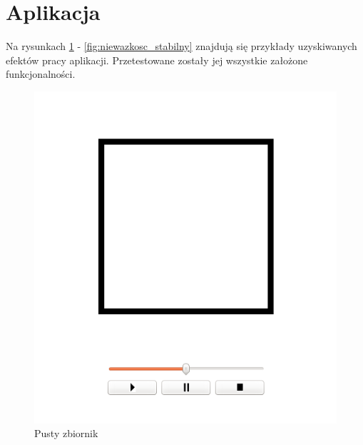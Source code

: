 
\section{Aplikacja}
Na rysunkach \ref{fig:pusty} - \ref{fig:niewazkosc_stabilny} znajdują się przykłady uzyskiwanych efektów pracy aplikacji. Przetestowane zostały jej wszystkie założone funkcjonalności.

\begin{minipage}{0.5\textwidth}
\begin{figure}[H]
 \begin{center} 
  \includegraphics[width=\textwidth]{./rysunki/pusty} 
 \end{center}
 \caption{Pusty zbiornik}
 \label{fig:pusty} 
\end{figure}
\end{minipage}
~
